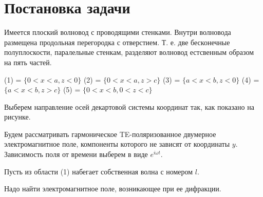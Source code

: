 \section{Постановка задачи}

Имеется плоский волновод с проводящими стенками. Внутри волновода размещена продольная перегородка с отверстием. Т. е. две бесконечные полуплоскости, паралельные стенкам, разделяют волновод естсвенным образом на пять частей.

(1) = $\{0<x<a, z<0\}$
(2) = $\{0<x<a, z>c\}$
(3) = $\{a<x<b, z<0\}$
(4) = $\{a<x<b, z>c\}$
(5) = $\{0<x<b, 0<z<c\}$

Выберем направление осей декартовой системы координат так, как показано на рисунке.


Будем рассматривать гармоническое TE-поляризованное двумерное электромагнитное поле, компоненты которого не зависят от координаты $y$. Зависимость поля от времени выберем в виде $e^{i\omega t}$.

Пусть из области (1) набегает собственная волна с номером $l$.

Надо найти электромагнитное поле, возникающее при ее дифракции.
